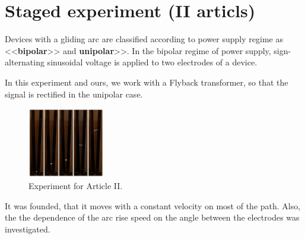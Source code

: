 \section{Staged experiment (II articls)}


Devices with a gliding arc are classified according
to power supply regime as <<\textbf{bipolar}>> and \textbf{unipolar}>>.
In the bipolar regime of power supply, sign-alternating 
sinusoidal voltage is applied to two electrodes of a
device.

In this experiment and ours, we work with a Flyback transformer, so that the signal is rectified in the unipolar case.

\begin{figure}[h]
    \centering
    \includegraphics[width=0.3\textwidth]{figures/1.png}
    \caption{Experiment for Article II.}
\end{figure}

It was founded, that it moves with a constant velocity on most of the path. Also, the the dependence of the arc rise speed on the angle between the electrodes was investigated.

